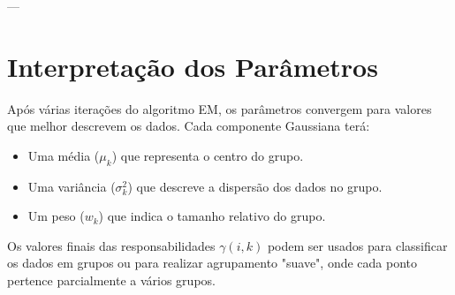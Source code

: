 \documentclass[a4paper,12pt]{article}
\begin{document}
---

\section*{Interpretação dos Parâmetros}

Após várias iterações do algoritmo EM, os parâmetros convergem para valores que melhor descrevem os dados. Cada componente Gaussiana terá:
\begin{itemize}
    \item Uma média ($\mu_k$) que representa o centro do grupo.
    \item Uma variância ($\sigma_k^2$) que descreve a dispersão dos dados no grupo.
    \item Um peso ($w_k$) que indica o tamanho relativo do grupo.
\end{itemize}

Os valores finais das responsabilidades $\gamma(i,k)$ podem ser usados para classificar os dados em grupos ou para realizar agrupamento "suave", onde cada ponto pertence parcialmente a vários grupos.
\end{document}
